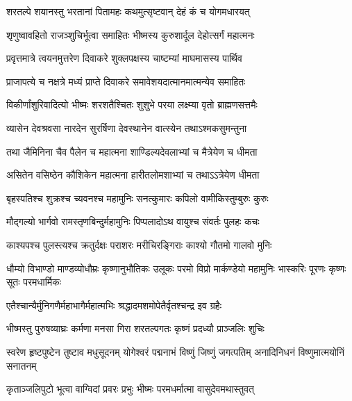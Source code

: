 

\twolineshloka
{शरतल्पे शयानस्तु भरतानां पितामहः}
{कथमुत्सृष्टवान् देहं कं च योगमधारयत्} %



\twolineshloka
{शृणुष्वावहितो राजञ्शुचिर्भूत्वा समाहितः}
{भीष्मस्य कुरुशार्दूल देहोत्सर्गं महात्मनः} %


\twolineshloka
{प्रवृत्तमात्रे त्वयनमुत्तरेण दिवाकरे}
{शुक्लपक्षस्य चाष्टम्यां माघमासस्य पार्थिव} %


\twolineshloka
{प्राजापत्ये च नक्षत्रे मध्यं प्राप्ते दिवाकरे}
{समावेशयदात्मानमात्मन्येव समाहितः} %


\twolineshloka
{विकीर्णांशुरिवादित्यो भीष्मः शरशतैश्चितः}
{शुशुभे परया लक्ष्म्या वृतो ब्राह्मणसत्तमैः} %


\twolineshloka
{व्यासेन देवश्रवसा नारदेन सुरर्षिणा}
{देवस्थानेन वात्स्येन तथाऽश्मकसुमन्तुना} %


\twolineshloka
{तथा जैमिनिना चैव पैलेन च महात्मना}
{शाण्डिल्यदेवलाभ्यां च मैत्रेयेण च धीमता} %


\twolineshloka
{असितेन वसिष्ठेन कौशिकेन महात्मना}
{हारीतलोमशाभ्यां च तथाऽऽत्रेयेण धीमता} %


\twolineshloka
{बृहस्पतिश्च शुक्रश्च च्यवनश्च महामुनिः}
{सनत्कुमारः कपिलो वामीकिस्तुम्बुरुः कुरुः} %


\twolineshloka
{मौद्गल्यो भार्गवो रामस्तृणबिन्दुर्महामुनिः}
{पिप्पलादोऽथ वायुश्च संवर्तः पुलहः कचः} %


\twolineshloka
{काश्यपश्च पुलस्त्यश्च क्रतुर्दक्षः पराशरः}
{मरीचिरङ्गिराः काश्यो गौतमो गालवो मुनिः} %


\threelineshloka
{धौम्यो विभाण्डो माण्डव्योधौम्रः कृष्णानुभौतिकः}
{उलूकः परमो विप्रो मार्कण्डेयो महामुनिः}
{भास्करिः पूरणः कृष्णः सूतः परमधार्मिकः} %


\twolineshloka
{एतैश्चान्यैर्मुनिगणैर्महाभागैर्महात्मभिः}
{श्रद्धादमशमोपेतैर्वृतश्चन्द्र इव ग्रहैः} %


\twolineshloka
{भीष्मस्तु पुरुषव्याघ्रः कर्मणा मनसा गिरा}
{शरतल्पगतः कृष्णं प्रदध्यौ प्राञ्जलिः शुचिः} %


\threelineshloka
{स्वरेण हृष्टपुष्टेन तुष्टाव मधुसूदनम्}
{योगेश्वरं पद्मनाभं विष्णुं जिष्णुं जगत्पतिम्}
{अनादिनिधनं विष्णुमात्मयोनिं सनातनम्} %


\twolineshloka
{कृताञ्जलिपुटो भूत्वा वाग्विदां प्रवरः प्रभुः}
{भीष्मः परमधर्मात्मा वासुदेवमथास्तुवत्} %


